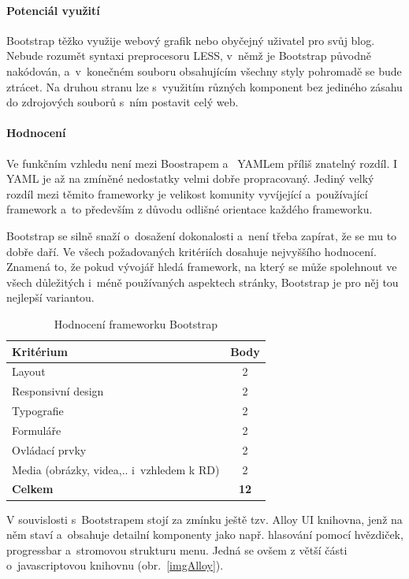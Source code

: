 \documentclass[thesis=B,czech]{FITthesis}[2012/06/26]
\begin{document}
\paragraph{Potenciál využití}

 Bootstrap těžko využije webový grafik nebo obyčejný uživatel pro svůj blog. Nebude rozumět syntaxi preprocesoru LESS, v~němž je Bootstrap původně nakódován, a~v~konečném souboru obsahujícím všechny styly pohromadě se bude ztrácet. Na druhou stranu lze s~využitím různých komponent bez jediného zásahu do zdrojových souborů s~ním postavit celý web. 

\paragraph{Hodnocení}

Ve funkčním vzhledu není mezi Boostrapem a~ \gls{YAML}em příliš znatelný rozdíl. I \gls{YAML} je až na zmíněné nedostatky velmi dobře propracovaný. Jediný velký rozdíl mezi těmito frameworky je velikost komunity vyvíjející a~používající framework a~to především z důvodu odlišné orientace každého frameworku.

Bootstrap se silně snaží o~dosažení dokonalosti a~není třeba zapírat, že se mu to dobře daří. Ve všech požadovaných kritériích dosahuje nejvyššího hodnocení. Znamená to, že pokud vývojář hledá framework, na který se může spolehnout ve všech důležitých i~méně používaných aspektech stránky, Bootstrap je pro něj tou nejlepší variantou.



\begin{table}[h]\centering
 	\caption[Hodnocení Bootstrapu]{Hodnocení frameworku Bootstrap}\label{tab:bootstrap}
 	\begin{tabular}{|l|c|}\hline
 	\textbf{Kritérium} & \textbf{Body}\tabularnewline
 	\hline\hline
		Layout & 2\tabularnewline
		\hline 
		 Responsivní design & 2\tabularnewline
		\hline 
		Typografie & 2\tabularnewline
		\hline 
		Formuláře & 2\tabularnewline
		\hline 
		Ovládací prvky & 2\tabularnewline
		\hline 
		Media  (obrázky, videa,.. i~vzhledem k RD) & 2\tabularnewline
		\hline 
		\textbf{Celkem} & \textbf{12}\tabularnewline
		\hline 
 	\end{tabular}
\end{table} 

V souvislosti s~Bootstrapem stojí za zmínku ještě tzv. Alloy UI knihovna, jenž na něm staví a~obsahuje detailní komponenty jako např. hlasování pomocí hvězdiček, progressbar a~stromovou strukturu menu. Jedná se ovšem z větší části o~javascriptovou knihovnu (obr.~\ref{imgAlloy}).
\end{document}
